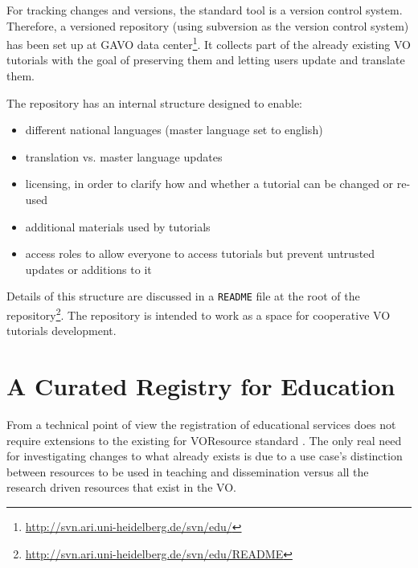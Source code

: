 \documentclass{ivoa}
\begin{document}
For tracking changes and versions, the standard tool is a version
control system.  Therefore,
a versioned repository (using subversion as the version control system) 
has been set up at GAVO data
center\footnote{\url{http://svn.ari.uni-heidelberg.de/svn/edu/}}.
It collects part of the
already existing VO tutorials with the goal of preserving them and
letting users 
update and translate them.

The repository has an internal structure designed to enable:

\begin{itemize}

\item different national languages (master language set to english){}

\item translation vs. master language updates{}

\item licensing, in order to clarify how and whether a tutorial can be changed or re-used{}

\item additional materials used by tutorials{}

\item access roles to allow everyone to access tutorials but prevent untrusted updates or additions to it{}

\end{itemize}

Details of this structure are discussed in a \texttt{README} file at the
root of the
repository\footnote{\url{http://svn.ari.uni-heidelberg.de/svn/edu/README}}.
The repository is intended to work as a space for cooperative 
VO tutorials development.



\section{A Curated Registry for Education}

\label{sect:curreg}


From a technical point of view the registration of educational services
does not require extensions
to the existing for VOResource standard \citep{2008ivoa.spec.0222P}.
The only real need for investigating changes to what already exists is due to a
use case's distinction between resources to be used in teaching and dissemination
versus all the research driven resources that exist in the VO.
\end{document}
